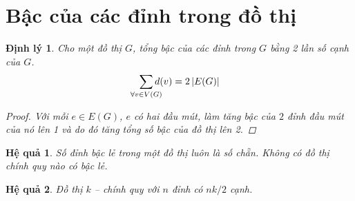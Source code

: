 \documentclass[14pt]{extarticle}
\newtheorem{theorem}{Định lý}[section]
\newtheorem{corolarry}{Hệ quả}[section]
\newcommand{\abs}[1]{\left\lvert#1\right\rvert}
\begin{document}
\section{Bậc của các đỉnh trong đồ thị}
\label{sec:bac_cua_dinh}
\begin{theorem}
	\label{theo:tong_bac_cua_dinh} Cho một đồ thị $G$, tổng bậc của các đỉnh trong $G$ bằng 2 lần số cạnh của $G$.
	\begin{equation*}
		\sum_{\mathclap{\forall v \in V(G)}}d(v) = 2\abs{E(G)}
	\end{equation*}
	\begin{proof}
		Với mỗi $e \in E(G)$, $e$ có hai đầu mút, làm tăng bậc của $2$ đỉnh đầu mút của nó lên 1 và do đó tăng tổng số bậc của đồ thị lên 2.
	\end{proof}
\end{theorem}
\begin{corolarry}
Số đỉnh bậc lẻ trong một đồ thị luôn là số chẵn. Không có đồ thị chính quy nào có bậc lẻ.
\end{corolarry}
\begin{corolarry}
	Đồ thị $k$ -- chính quy với $n$ đỉnh có $nk/2$ cạnh.
\end{corolarry}
\end{document}
